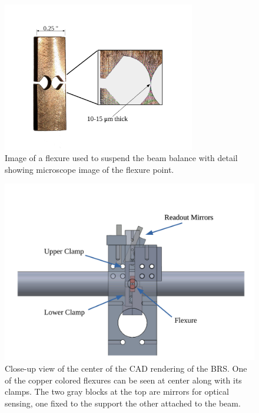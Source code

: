 \documentclass [12pt, proquest]{uwthesis}[2019]
\begin{document}
\begin{figure}[!h]
\begin{center}
 \includegraphics[width=0.75\textwidth]{Flexure.pdf}
\caption[Image of a BRS flexure]{Image of a flexure used to suspend the beam balance with detail showing microscope image of the flexure point.}
\label{flexure}
\end{center}
\end{figure}

\begin{figure}[!h]
\begin{center} 
\includegraphics[width=\textwidth]{BRSFrontDetailLabeled.pdf}
\end{center}
\caption[Close up view of the center of the CAD rendering of the BRS]{Close-up view of the center of the CAD rendering of the BRS. One of the copper colored flexures can be seen at center along with its clamps. The two gray blocks at the top are mirrors for optical sensing, one fixed to the support the other attached to the beam.} \label{BRSFrontD}
\end{figure}
\end{document}
